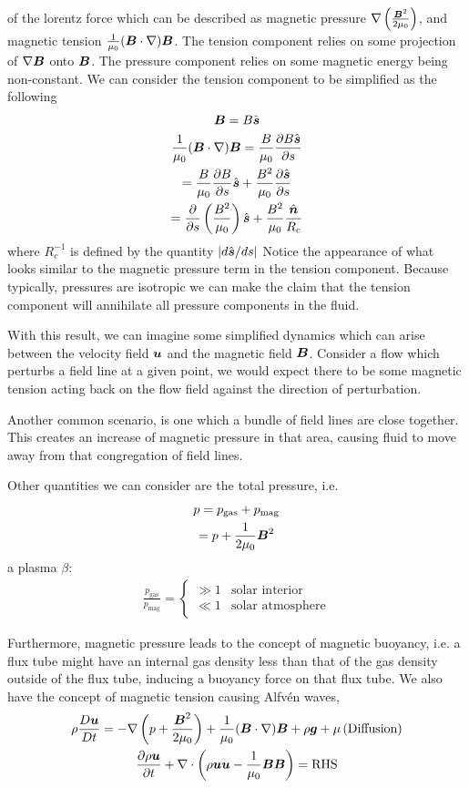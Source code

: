 \documentclass{article}
\begin{document}
of the lorentz force which can be described as magnetic pressure
$\nabla\left(\frac{\boldsymbol{B}^2}{2\mu_0}\right)$, and magnetic tension
$\frac{1}{\mu_0}(\boldsymbol{B}\cdot\nabla)\boldsymbol{B}$. The tension component relies on some
projection of $\nabla\boldsymbol{B}$ onto $\boldsymbol{B}$. The pressure component relies on some
magnetic energy being non-constant. We can consider the tension component to be
simplified as the following
\begin{gather*}
    \boldsymbol{B} = B\hat{\boldsymbol{s}}\\
    \frac{1}{\mu_0}(\boldsymbol{B}\cdot\nabla)\boldsymbol{B} = \frac{B}{\mu_0}\frac{\partial B\hat{\boldsymbol{s}}}{\partial s}\\
    =\frac{B}{\mu_0}\frac{\partial B}{\partial s}\hat{\boldsymbol{s}} +
    \frac{B^2}{\mu_0}\frac{\partial \hat{\boldsymbol{s}}}{\partial s}\\
     = \frac{\partial }{\partial s} \left(\frac{B^2}{\mu_0}\right) \hat{\boldsymbol{s}} +
     \frac{B^2}{\mu_0}\frac{\hat{\boldsymbol{n}}}{R_c}
\end{gather*}
where $R_c^{-1}$ is defined by the quantity $\left|d\hat{\boldsymbol{s}}/ds\right|$
Notice the appearance of what looks similar to the magnetic pressure term in the
tension component. Because typically, pressures are isotropic we can make the
claim that the tension component will annihilate all pressure components in the
fluid.

With this result, we can imagine some simplified dynamics which can arise
between the velocity field $\boldsymbol{u}$ and the magnetic field $\boldsymbol{B}$. Consider a flow
which perturbs a field line at a given point, we would expect there to be some
magnetic tension acting back on the flow field against the direction of
perturbation. 

Another common scenario, is one which a bundle of field lines are close
together. This creates an increase of magnetic pressure in that area, causing
fluid to move away from that congregation of field lines. 

Other quantities we can consider are the total pressure, i.e.
\begin{gather*}
    p = p_{\text{gas}} + p_{\text{mag}} \\
    = p + \frac{1}{2\mu_0}\boldsymbol{B}^2
\end{gather*}
a plasma $\beta$:
\begin{gather*}
    \frac{p_{\text{gas}}}{p_{\text{mag}}} = \begin{cases}
    \gg 1 & \text{solar interior}\\
    \ll 1 & \text{solar atmosphere}\end{cases}
\end{gather*}

Furthermore, magnetic pressure leads to the concept of magnetic buoyancy, i.e. a
flux tube might have an internal gas density less than that of the gas density
outside of the flux tube, inducing a buoyancy force on that flux tube. We also
have the concept of magnetic tension causing Alfv\'en waves, 
\begin{gather*}
    \rho\frac{D \boldsymbol{u}}{D t} = -\nabla\left(p + \frac{\boldsymbol{B}^2}{2\mu_0}\right) +
    \frac{1}{\mu_0}(\boldsymbol{B}\cdot\nabla)\boldsymbol{B} + \rho\boldsymbol{g} +
    \mu\left(\text{Diffusion}\right)\\
    \frac{\partial \rho\boldsymbol{u}}{\partial t} + \nabla \cdot\left(\rho\boldsymbol{u}\boldsymbol{u} - \frac{1}{\mu_0}\boldsymbol{B}\boldsymbol{B}\right) = \text{RHS}
\end{gather*}
\end{document}

